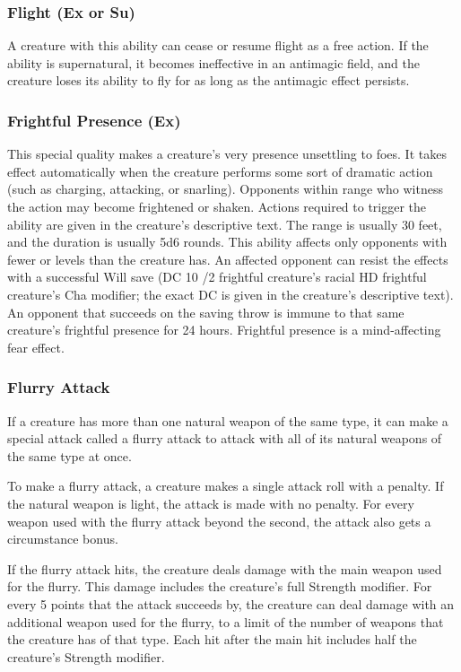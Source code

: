{\subsubsection{Flight (Ex or Su)} A creature with this ability can cease or resume flight as a free action. If the ability is supernatural, it becomes ineffective in an antimagic field, and the creature loses its ability to fly for as long as the antimagic effect persists.

\subsubsection{Frightful Presence (Ex)} This special quality makes a creature's very presence unsettling to foes. It takes effect automatically when the creature performs some sort of dramatic action (such as charging, attacking, or snarling). Opponents within range who witness the action may become frightened or shaken. Actions required to trigger the ability are given in the creature's descriptive text. The range is usually 30 feet, and the duration is usually 5d6 rounds. This ability affects only opponents with fewer  or levels than the creature has. An affected opponent can resist the effects with a successful Will save (DC 10 /2 frightful creature's racial HD \add frightful creature's Cha modifier; the exact DC is given in the creature's descriptive text). An opponent that succeeds on the saving throw is immune to that same creature's frightful presence for 24 hours. Frightful presence is a mind-affecting fear effect. 


\subsubsection{Flurry Attack} If a creature has more than one natural weapon of the same type, it can make a special attack called a flurry attack to attack with all of its natural weapons of the same type at once.

To make a flurry attack, a creature makes a single attack roll with a  penalty. If the natural weapon is light, the attack is made with no penalty. For every weapon used with the flurry attack beyond the second, the attack also gets a  circumstance bonus.

If the flurry attack hits, the creature deals damage with the main weapon used for the flurry. This damage includes the creature's full Strength modifier. For every 5 points that the attack succeeds by, the creature can deal damage with an additional weapon used for the flurry, to a limit of the number of weapons that the creature has of that type. Each hit after the main hit includes half the creature's Strength modifier.

}
